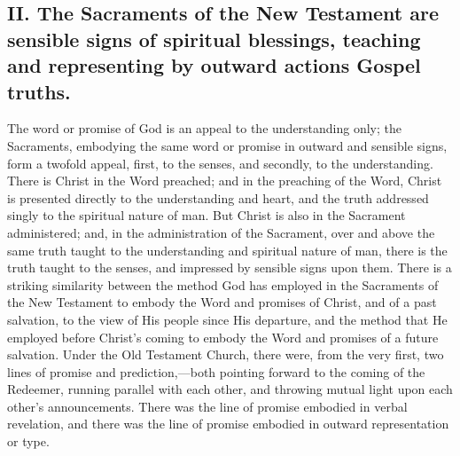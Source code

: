\documentclass[]{book}
\begin{document}
\hypertarget{ii.-the-sacraments-of-the-new-testament-are-sensible-signs-of-spiritual-blessings-teaching-and-representing-by-outward-actions-gospel-truths.}{%
\subsection{II. The Sacraments of the New Testament are sensible signs of spiritual blessings, teaching and representing by outward actions Gospel truths.}\label{ii.-the-sacraments-of-the-new-testament-are-sensible-signs-of-spiritual-blessings-teaching-and-representing-by-outward-actions-gospel-truths.}}

The word or promise of God is an appeal to the understanding only; the Sacraments, embodying the same word or promise in outward and sensible signs, form a twofold appeal, first, to the senses, and secondly, to the understanding. There is Christ in the Word preached; and in the preaching of the Word, Christ is presented directly to the understanding and heart, and the truth addressed singly to the spiritual nature of man. But Christ is also in the Sacrament administered; and, in the administration of the Sacrament, over and above the same truth taught to the understanding and spiritual nature of man, there is the truth taught to the senses, and impressed by sensible signs upon them. There is a striking similarity between the method God has employed in the Sacraments of the New Testament to embody the Word and promises of Christ, and of a past salvation, to the view of His people since His departure, and the method that He employed before Christ's coming to embody the Word and promises of a future salvation. Under the Old Testament Church, there were, from the very first, two lines of promise and prediction,---both pointing forward to the coming of the Redeemer, running parallel with each other, and throwing mutual light upon each other's announcements. There was the line of promise embodied in verbal revelation, and there was the line of promise embodied in outward representation or type.
\end{document}
